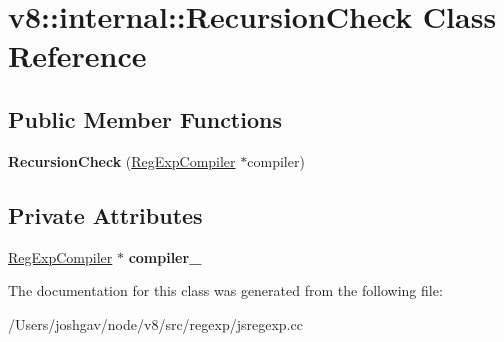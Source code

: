 \hypertarget{classv8_1_1internal_1_1_recursion_check}{}\section{v8\+:\+:internal\+:\+:Recursion\+Check Class Reference}
\label{classv8_1_1internal_1_1_recursion_check}
\subsection*{Public Member Functions}
\begin{DoxyCompactItemize}
\item 
{\bfseries Recursion\+Check} (\hyperlink{classv8_1_1internal_1_1_reg_exp_compiler}{Reg\+Exp\+Compiler} $\ast$compiler)\hypertarget{classv8_1_1internal_1_1_recursion_check_a35c0b952b582e12ff1307c6e804b4d90}{}\label{classv8_1_1internal_1_1_recursion_check_a35c0b952b582e12ff1307c6e804b4d90}

\end{DoxyCompactItemize}
\subsection*{Private Attributes}
\begin{DoxyCompactItemize}
\item 
\hyperlink{classv8_1_1internal_1_1_reg_exp_compiler}{Reg\+Exp\+Compiler} $\ast$ {\bfseries compiler\+\_\+}\hypertarget{classv8_1_1internal_1_1_recursion_check_a6661f8e630436c19c240b01f8243909c}{}\label{classv8_1_1internal_1_1_recursion_check_a6661f8e630436c19c240b01f8243909c}

\end{DoxyCompactItemize}


The documentation for this class was generated from the following file\+:\begin{DoxyCompactItemize}
\item 
/\+Users/joshgav/node/v8/src/regexp/jsregexp.\+cc\end{DoxyCompactItemize}
